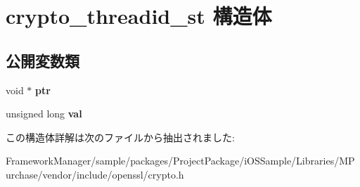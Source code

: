 \hypertarget{structcrypto__threadid__st}{}\section{crypto\+\_\+threadid\+\_\+st 構造体}
\label{structcrypto__threadid__st}
\subsection*{公開変数類}
\begin{DoxyCompactItemize}
\item 
\hypertarget{structcrypto__threadid__st_a682e95abcf3ddb87da11e9d64dc04e71}{}void $\ast$ {\bfseries ptr}\label{structcrypto__threadid__st_a682e95abcf3ddb87da11e9d64dc04e71}

\item 
\hypertarget{structcrypto__threadid__st_ae211eb79aaff1a57eba548fb6fda0e2a}{}unsigned long {\bfseries val}\label{structcrypto__threadid__st_ae211eb79aaff1a57eba548fb6fda0e2a}

\end{DoxyCompactItemize}


この構造体詳解は次のファイルから抽出されました\+:\begin{DoxyCompactItemize}
\item 
Framework\+Manager/sample/packages/\+Project\+Package/i\+O\+S\+Sample/\+Libraries/\+M\+Purchase/vendor/include/openssl/crypto.\+h\end{DoxyCompactItemize}
